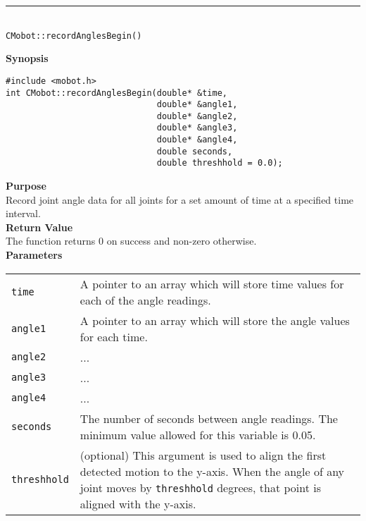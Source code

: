 \noindent
\vspace{5pt}
\rule{4.5in}{0.015in}\\
\noindent
{\LARGE \texttt{CMobot::recordAnglesBegin()}}\\
{}

\noindent
{\bf Synopsis}
\vspace{-8pt}
\begin{verbatim}
#include <mobot.h>
int CMobot::recordAnglesBegin(double* &time, 
                              double* &angle1, 
                              double* &angle2, 
                              double* &angle3, 
                              double* &angle4, 
                              double seconds,
                              double threshhold = 0.0);
\end{verbatim}

\noindent
{\bf Purpose}\\
Record joint angle data for all joints for a set amount of time at a specified time interval.\\

\noindent
{\bf Return Value}\\
The function returns 0 on success and non-zero otherwise.\\

\noindent
{\bf Parameters}\\
\vspace{-0.1in}
\begin{description}
\item               
\begin{tabular}{p{15 mm}p{145 mm}}
\texttt{time} & A pointer to an array which will store time values for each of the angle readings. \\
\texttt{angle1} & A pointer to an array which will store the angle values for each time. \\
\texttt{angle2} & ... \\
\texttt{angle3} & ... \\
\texttt{angle4} & ... \\
\texttt{seconds} & The number of seconds between angle readings. The minimum value allowed for
this variable is 0.05. \\
\texttt{threshhold} & (optional) This argument is used to align the first
detected motion to the y-axis. When the angle of any joint moves by
\texttt{threshhold} degrees, that point is aligned with the y-axis.
\end{tabular}
\end{description}

